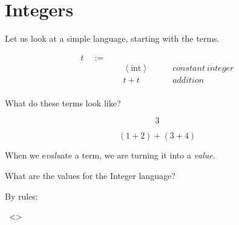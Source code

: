 
\section{Integers}

\begin{frame}[c]
  \begin{center}
    Let us look at a simple language, starting with the terms.
  \end{center}
\end{frame}

\begin{frame}
\begin{displaymath}
    \begin{aligned}
t \quad:=\quad& ~ &\\
  & ~ \left<\text{int}\right> \quad\quad &constant~integer\\
  & ~ t + t \quad\quad &addition\\
    \end{aligned}
  \end{displaymath}
\end{frame}

\begin{frame}[c]
    What do these terms look like?
\end{frame}

\begin{frame}
\begin{displaymath}
  3 
\end{displaymath}
\end{frame}

\begin{frame}
\begin{displaymath}
  (1 + 2) + (3 + 4)
\end{displaymath}
\end{frame}

\begin{frame}[c]
  When we e{\it valu}ate a term, we are turning it into a {\it value}.
\end{frame}

\begin{frame}[c]
  What are the values for the Integer language?
\end{frame}

\begin{frame}

  By rules:

  \infrule[V-Int]
          {}
          {~\left<\right>}
\end{frame}

